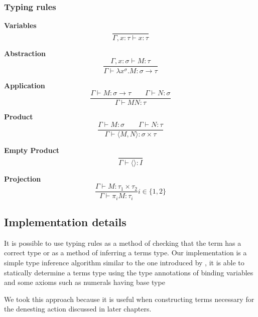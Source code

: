 \documentclass[12pt,a4paper]{report}
\theoremstyle{definition}
\theoremstyle{remark}
\begin{document}
\subsubsection{Typing rules} 

\textbf{Variables}
\begin{equation}
    \frac{}{\Gamma, x:\tau \vdash x: \tau}
\end{equation}

\textbf{Abstraction}
\begin{equation}
    \frac{\Gamma, x:\sigma \vdash M : \tau}{\Gamma \vdash \lambda x^{\sigma}. M : \sigma \rightarrow \tau}
\end{equation}

\textbf{Application}
\begin{equation}
    \frac{\Gamma \vdash M : \sigma \rightarrow \tau \quad\quad \Gamma \vdash N : \sigma}{\Gamma \vdash MN : \tau}
\end{equation}

\textbf{Product}
\begin{equation}
    \frac{\Gamma \vdash M:\sigma \quad\quad \Gamma \vdash N:\tau}{\Gamma \vdash \langle M,N \rangle : \sigma \times \tau}
\end{equation}

\textbf{Empty Product}
\begin{equation}
    \frac{}{\Gamma \vdash \langle \rangle : I}
\end{equation}

\textbf{Projection}
\begin{equation}
    \frac{\Gamma \vdash M:\tau_1 \times \tau_2}{\Gamma \vdash \pi_i M: \tau_i} i \in \{1, 2\}
\end{equation}

\subsection{Implementation details} 
It is possible to use typing rules as a method of checking that the term has a correct type or as a method of inferring a terms type. Our implementation is a simple type inference algorithm similar to the one introduced by \cite{curry1958combinatory}, it is able to statically determine a terms type using the type annotations of binding variables and some axioms such as numerals having base type

We took this approach because it is useful when constructing terms necessary for the denesting action discussed in later chapters.
\end{document}
